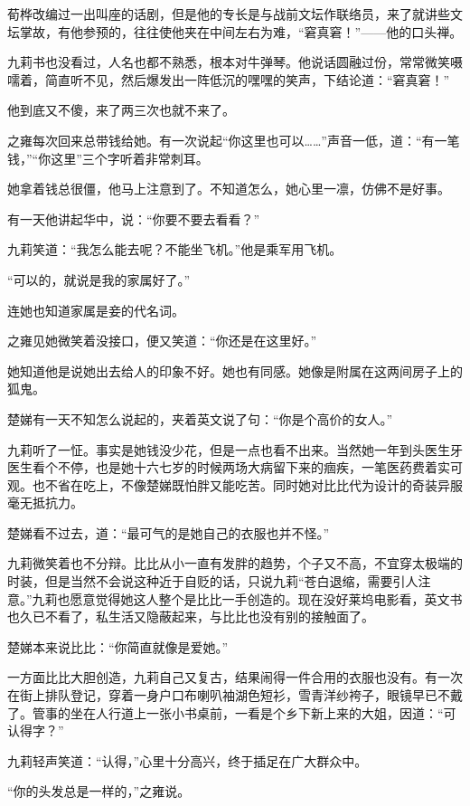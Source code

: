 \par 荀桦改编过一出叫座的话剧，但是他的专长是与战前文坛作联络员，来了就讲些文坛掌故，有他参预的，往往使他夹在中间左右为难，“窘真窘！”——他的口头禅。
\par 九莉书也没看过，人名也都不熟悉，根本对牛弹琴。他说话圆融过份，常常微笑嗫嚅着，简直听不见，然后爆发出一阵低沉的嘿嘿的笑声，下结论道：“窘真窘！”
\par 他到底又不傻，来了两三次也就不来了。
\par 之雍每次回来总带钱给她。有一次说起“你这里也可以……”声音一低，道：“有一笔钱，”“你这里”三个字听着非常刺耳。
\par 她拿着钱总很僵，他马上注意到了。不知道怎么，她心里一凛，仿佛不是好事。
\par 有一天他讲起华中，说：“你要不要去看看？”
\par 九莉笑道：“我怎么能去呢？不能坐飞机。”他是乘军用飞机。
\par “可以的，就说是我的家属好了。”
\par 连她也知道家属是妾的代名词。
\par 之雍见她微笑着没接口，便又笑道：“你还是在这里好。”
\par 她知道他是说她出去给人的印象不好。她也有同感。她像是附属在这两间房子上的狐鬼。
\par 楚娣有一天不知怎么说起的，夹着英文说了句：“你是个高价的女人。”
\par 九莉听了一怔。事实是她钱没少花，但是一点也看不出来。当然她一年到头医生牙医生看个不停，也是她十六七岁的时候两场大病留下来的痼疾，一笔医药费着实可观。也不省在吃上，不像楚娣既怕胖又能吃苦。同时她对比比代为设计的奇装异服毫无抵抗力。
\par 楚娣看不过去，道：“最可气的是她自己的衣服也并不怪。”
\par 九莉微笑着也不分辩。比比从小一直有发胖的趋势，个子又不高，不宜穿太极端的时装，但是当然不会说这种近于自贬的话，只说九莉“苍白退缩，需要引人注意。”九莉也愿意觉得她这人整个是比比一手创造的。现在没好莱坞电影看，英文书也久已不看了，私生活又隐蔽起来，与比比也没有别的接触面了。
\par 楚娣本来说比比：“你简直就像是爱她。”
\par 一方面比比大胆创造，九莉自己又复古，结果闹得一件合用的衣服也没有。有一次在街上排队登记，穿着一身户口布喇叭袖湖色短衫，雪青洋纱袴子，眼镜早已不戴了。管事的坐在人行道上一张小书桌前，一看是个乡下新上来的大姐，因道：“可认得字？”
\par 九莉轻声笑道：“认得，”心里十分高兴，终于插足在广大群众中。
\par “你的头发总是一样的，”之雍说。
